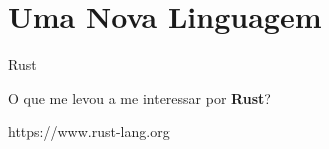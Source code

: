\section{Uma Nova Linguagem}

\begin{frame}[fragile]{Rust}
\begin{figure}[ht!]
  \centering
  
\end{figure}
\begin{center}
    O que me levou a me interessar por \textbf{Rust}?
\end{center}

\begin{center}
    https://www.rust-lang.org
\end{center}{}
\end{frame}

